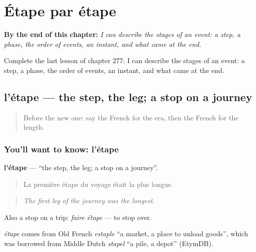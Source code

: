 
\chapter{Étape par étape}
\label{ch:fr-etape-par-etape}

\begin{chapteropening}
\textbf{By the end of this chapter:} \emph{I can describe the stages of an event: a step, a phase, the order of events, an instant, and what came at the end.}

Complete the last lesson of chapter 277: I can describe the stages of an event: a step, a phase, the order of events, an instant, and what came at the end.
\end{chapteropening}

\section[l'étape]{l'étape — the step, the leg; a stop on a journey}

\label{lesson:FR-C277-etape}



\begin{quote}
Before the new one: say the French for the era, then the French for the length.
\end{quote}

\subsection*{You'll want to know: l'étape}
\textbf{l'étape} — \textquotedblleft{}the step, the leg; a stop on a journey\textquotedblright{}.

\begin{quote}
La première étape du voyage était la plus longue.
\end{quote}

\begin{quote}
\emph{The first leg of the journey was the longest.}
\end{quote}

Also a stop on a trip: \emph{faire étape} — to stop over.

\begin{cousinweb}
\emph{étape} comes from Old French \emph{estaple} \textquotedblleft{}a market, a place to unload goods\textquotedblright{}, which was borrowed from Middle Dutch \emph{stapel} \textquotedblleft{}a pile, a depot\textquotedblright{} (EtymDB).
\end{cousinweb}


